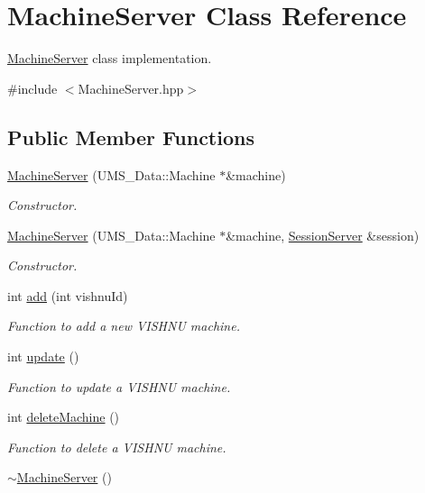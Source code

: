 \hypertarget{classMachineServer}{
\section{MachineServer Class Reference}
\label{classMachineServer}
}


\hyperlink{classMachineServer}{MachineServer} class implementation.  




{\ttfamily \#include $<$MachineServer.hpp$>$}

\subsection*{Public Member Functions}
\begin{DoxyCompactItemize}
\item 
\hyperlink{classMachineServer_a067dab7512c1882721579dea892a5f8c}{MachineServer} (UMS\_\-Data::Machine $\ast$\&machine)
\begin{DoxyCompactList}\small\item\em Constructor. \item\end{DoxyCompactList}\item 
\hyperlink{classMachineServer_ac65f4c23f95852a0725a0561b276f383}{MachineServer} (UMS\_\-Data::Machine $\ast$\&machine, \hyperlink{classSessionServer}{SessionServer} \&session)
\begin{DoxyCompactList}\small\item\em Constructor. \item\end{DoxyCompactList}\item 
int \hyperlink{classMachineServer_a9b8152eefc63abc02a3d15419ce91dd6}{add} (int vishnuId)
\begin{DoxyCompactList}\small\item\em Function to add a new VISHNU machine. \item\end{DoxyCompactList}\item 
int \hyperlink{classMachineServer_a06dcfd04b484d41b54554978c45b73c8}{update} ()
\begin{DoxyCompactList}\small\item\em Function to update a VISHNU machine. \item\end{DoxyCompactList}\item 
int \hyperlink{classMachineServer_a0efa7bde46c67e38e973705363c3d8a1}{deleteMachine} ()
\begin{DoxyCompactList}\small\item\em Function to delete a VISHNU machine. \item\end{DoxyCompactList}\item 
\hypertarget{classMachineServer_a03bf79f9afe40bcc63212b03b0eef81a}{
\hyperlink{classMachineServer_a03bf79f9afe40bcc63212b03b0eef81a}{$\sim$MachineServer} ()}
\label{classMachineServer_a03bf79f9afe40bcc63212b03b0eef81a}


\end{DoxyCompactItemize}
